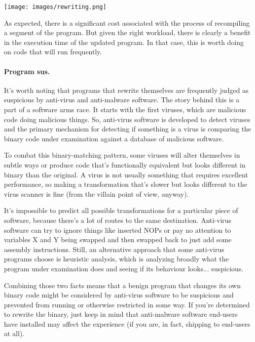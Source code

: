 \documentclass[a4paper]{report}
\begin{document}
\begin{center}
	\texttt{[image: images/rewriting.png]}
\end{center}

As expected, there is a significant cost associated with the process of recompiling a segment of the program. But given the right workload, there is clearly a benefit in the execution time of the updated program. In that case, this is worth doing on code that will run frequently.

\paragraph{Program sus.}
It's worth noting that programs that rewrite themselves are frequently judged as suspicious by anti-virus and anti-malware software. The story behind this is a part of a software arms race. It starts with the first viruses, which are malicious code doing malicious things. So, anti-virus software is developed to detect viruses and the primary mechanism for detecting if something is a virus is comparing the binary code under examination against a database of malicious software.

To combat this binary-matching pattern, some viruses will alter themselves in subtle ways or produce code that's functionally equivalent but looks different in binary than the original. A virus is not usually something that requires excellent performance, so making a transformation that's slower but looks different to the virus scanner is fine (from the villain point of view, anyway).

It's impossible to predict all possible transformations for a particular piece of software, because there's a lot of routes to the same destination. Anti-virus software can try to ignore things like inserted NOPs or pay no attention to variables X and Y being swapped and then swapped back to just add some assembly instructions. Still, an alternative approach that some anti-virus programs choose is heuristic analysis, which is analyzing broadly what the program under examination does and seeing if its behaviour looks... suspicious.

Combining those two facts means that a benign program that changes its own binary code might be considered by anti-virus software to be suspicious and prevented from running or otherwise restricted in some way. If you're determined to rewrite the binary, just keep in mind that anti-malware software end-users have installed may affect the experience (if you are, in fact, shipping to end-users at all).
\end{document}
